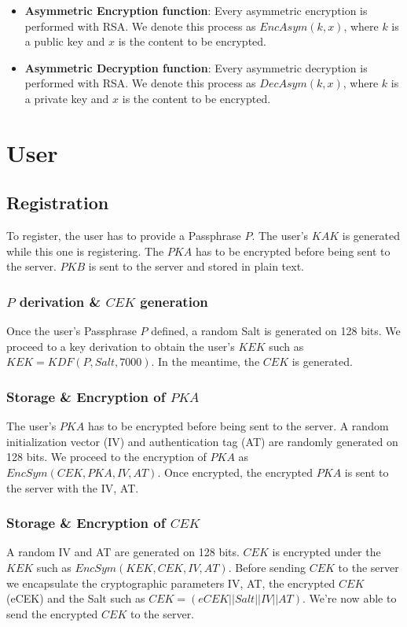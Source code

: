 \documentclass[a4paper,10pt]{article}
\begin{document}
\begin{itemize}
    \item \textbf{Asymmetric Encryption function}:
    Every asymmetric encryption is performed with RSA. We denote this process as $EncAsym(k,x)$, where $k$ is a public key and $x$ is the content to be encrypted.
    \item \textbf{Asymmetric Decryption function}:
    Every asymmetric decryption is performed with RSA. We denote this process as $DecAsym(k, x)$, where $k$ is a private key and $x$ is the content to be encrypted.
\end{itemize}

\section{User}
\subsection{Registration}
To register, the user has to provide a Passphrase $P$. The user's $KAK$ is generated while this one is registering. The $PKA$ has to be encrypted before being sent to the server. $PKB$ is sent to the server and stored in plain text.
\subsubsection{$P$ derivation \& $CEK$ generation}
Once the user's Passphrase $P$ defined, a random Salt is generated on 128 bits. We proceed to a key derivation to obtain the user's $KEK$ such as $KEK=KDF(P, Salt, 7000)$. In the meantime, the $CEK$ is generated.
\subsubsection{Storage \& Encryption of $PKA$}
The user's $PKA$ has to be encrypted before being sent to the server. A random initialization vector (IV) and authentication tag (AT) are randomly generated on 128 bits. We proceed to the encryption of $PKA$ as $EncSym(CEK, PKA, IV, AT)$. Once encrypted, the encrypted $PKA$ is sent to the server with the IV, AT.
\subsubsection{Storage \& Encryption of $CEK$}
A random IV and AT are generated on 128 bits. $CEK$ is encrypted under the $KEK$ such as $EncSym(KEK,CEK, IV, AT)$. Before sending $CEK$ to the server we encapsulate the cryptographic parameters IV, AT, the encrypted $CEK$ (eCEK) and the Salt such as $CEK=(eCEK||Salt||IV||AT)$. We're now able to send the encrypted $CEK$ to the server.
\end{document}
